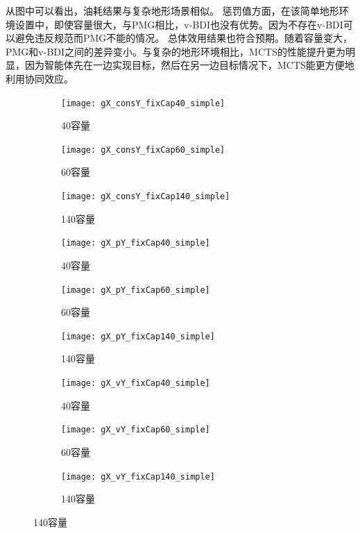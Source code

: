 从图中可以看出，油耗结果与复杂地形场景相似。
惩罚值方面，在该简单地形环境设置中，即使容量很大，与PMG相比，v-BDI也没有优势。因为不存在v-BDI可以避免违反规范而PMG不能的情况。
总体效用结果也符合预期。随着容量变大，PMG和v-BDI之间的差异变小。与复杂的地形环境相比，MCTS的性能提升更为明显，因为智能体先在一边实现目标，然后在另一边目标情况下，MCTS能更方便地利用协同效应。
\begin{figure}[H]
\centering
\begin{subfigure}{.32\textwidth}
  \centering
  \texttt{[image: gX\_consY\_fixCap40\_simple]}
  \caption{40容量}
  \captionsetup{justification=centering}
\end{subfigure}
\begin{subfigure}{.32\textwidth}
  \centering
  \texttt{[image: gX\_consY\_fixCap60\_simple]}
  \caption{60容量}
  \captionsetup{justification=centering}
\end{subfigure}
\begin{subfigure}{.32\textwidth}
  \centering
  \texttt{[image: gX\_consY\_fixCap140\_simple]}
  \caption{140容量}
  \captionsetup{justification=centering}
\end{subfigure}
\begin{subfigure}{.32\textwidth}
  \centering
  \texttt{[image: gX\_pY\_fixCap40\_simple]}
  \caption{40容量}
  \captionsetup{justification=centering}
\end{subfigure}
\begin{subfigure}{.32\textwidth}
  \centering
  \texttt{[image: gX\_pY\_fixCap60\_simple]}
  \caption{60容量}
  \captionsetup{justification=centering}
\end{subfigure}
\begin{subfigure}{.32\textwidth}
  \centering
  \texttt{[image: gX\_pY\_fixCap140\_simple]}
  \caption{140容量}
  \captionsetup{justification=centering}
\end{subfigure}
\begin{subfigure}{.32\textwidth}
  \centering
  \texttt{[image: gX\_vY\_fixCap40\_simple]}
  \caption{40容量}
  \captionsetup{justification=centering}
\end{subfigure}
\begin{subfigure}{.32\textwidth}
  \centering
  \texttt{[image: gX\_vY\_fixCap60\_simple]}
  \caption{60容量}
  \captionsetup{justification=centering}
\end{subfigure}
\begin{subfigure}{.32\textwidth}
  \centering
  \texttt{[image: gX\_vY\_fixCap140\_simple]}
  \caption{140容量}
  \captionsetup{justification=centering}
\end{subfigure}
\captionsetup{justification=centering}
\label{fig:static_simple}
\end{figure}

